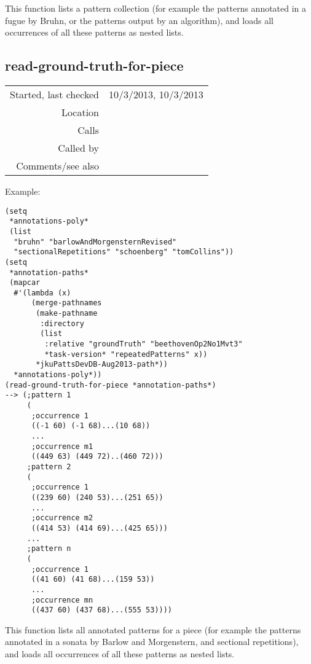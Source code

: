 \noindent This function lists a pattern collection
(for example the patterns annotated in a fugue by
Bruhn, or the patterns output by an algorithm), and
loads all occurrences of all these patterns as nested
lists.


\subsection*{read-ground-truth-for-piece}\label{fun:read-ground-truth-for-piece}

\vspace{0.3cm}
\begin{tabular}{r|p{8cm}}
Started, last checked & 10/3/2013, 10/3/2013 \\
Location & \nameref{sec:evaluate-discovered-versus-annotated-patterns} \\
Calls & \nameref{fun:read-pattsnoccs} \\
Called by & \nameref{fun:metrics-for-algorithmnpiece} \\
Comments/see also &
\end{tabular}

\vspace{0.5cm}
\noindent Example:
\begin{verbatim}
(setq
 *annotations-poly*
 (list
  "bruhn" "barlowAndMorgensternRevised"
  "sectionalRepetitions" "schoenberg" "tomCollins"))
(setq
 *annotation-paths*
 (mapcar
  #'(lambda (x)
      (merge-pathnames
       (make-pathname
        :directory
        (list
         :relative "groundTruth" "beethovenOp2No1Mvt3"
         *task-version* "repeatedPatterns" x))
       *jkuPattsDevDB-Aug2013-path*))
  *annotations-poly*))
(read-ground-truth-for-piece *annotation-paths*)
--> (;pattern 1
     (
      ;occurrence 1
      ((-1 60) (-1 68)...(10 68))
      ...
      ;occurrence m1
      ((449 63) (449 72)..(460 72)))
     ;pattern 2
     (
      ;occurrence 1
      ((239 60) (240 53)...(251 65))
      ...
      ;occurrence m2
      ((414 53) (414 69)...(425 65)))
     ...
     ;pattern n
     (
      ;occurrence 1
      ((41 60) (41 68)...(159 53))
      ...
      ;occurrence mn
      ((437 60) (437 68)...(555 53))))
\end{verbatim}

\noindent This function lists all annotated patterns
for a piece (for example the patterns annotated in a
sonata by Barlow and Morgenstern, and sectional
repetitions), and loads all occurrences of all these
patterns as nested lists.









